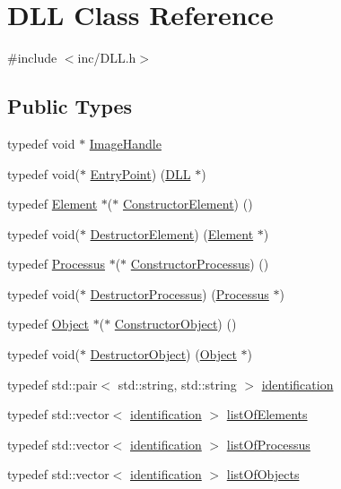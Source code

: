 \hypertarget{classDLL}{}\section{D\+LL Class Reference}
\label{classDLL}


{\ttfamily \#include $<$inc/\+D\+L\+L.\+h$>$}

\subsection*{Public Types}
\begin{DoxyCompactItemize}
\item 
typedef void $\ast$ \hyperlink{classDLL_addaefe5c907a5f357cc18718300f22b0}{Image\+Handle}
\item 
typedef void($\ast$ \hyperlink{classDLL_a6d72472c2f54dc82cbb6a5bbab70dae6}{Entry\+Point}) (\hyperlink{classDLL}{D\+LL} $\ast$)
\item 
typedef \hyperlink{classElement}{Element} $\ast$($\ast$ \hyperlink{classDLL_a104a81e667f9a54504c0faf095f77fc7}{Constructor\+Element}) ()
\item 
typedef void($\ast$ \hyperlink{classDLL_a204f0c776712969410a2673db3d98cf5}{Destructor\+Element}) (\hyperlink{classElement}{Element} $\ast$)
\item 
typedef \hyperlink{classProcessus}{Processus} $\ast$($\ast$ \hyperlink{classDLL_afbf4c85f3517962642944b80833a3607}{Constructor\+Processus}) ()
\item 
typedef void($\ast$ \hyperlink{classDLL_a203a61b2a683e2751b5f3fe5a7187a7e}{Destructor\+Processus}) (\hyperlink{classProcessus}{Processus} $\ast$)
\item 
typedef \hyperlink{classObject}{Object} $\ast$($\ast$ \hyperlink{classDLL_a67b9601085a9f972b9ac6876cd11398e}{Constructor\+Object}) ()
\item 
typedef void($\ast$ \hyperlink{classDLL_a4400d330cd793ae5f883ffa58384f637}{Destructor\+Object}) (\hyperlink{classObject}{Object} $\ast$)
\item 
typedef std\+::pair$<$ std\+::string, std\+::string $>$ \hyperlink{classDLL_aa2df9e9226052bfa93a6df56f1ca689b}{identification}
\item 
typedef std\+::vector$<$ \hyperlink{classDLL_aa2df9e9226052bfa93a6df56f1ca689b}{identification} $>$ \hyperlink{classDLL_a36792635c3cd36adbaaef2ff7152046e}{list\+Of\+Elements}
\item 
typedef std\+::vector$<$ \hyperlink{classDLL_aa2df9e9226052bfa93a6df56f1ca689b}{identification} $>$ \hyperlink{classDLL_aded1b0bb41b288ed4f34cb6d6632d486}{list\+Of\+Processus}
\item 
typedef std\+::vector$<$ \hyperlink{classDLL_aa2df9e9226052bfa93a6df56f1ca689b}{identification} $>$ \hyperlink{classDLL_a68629aa6f9103c5a3082511ff8218b1e}{list\+Of\+Objects}
\end{DoxyCompactItemize}
